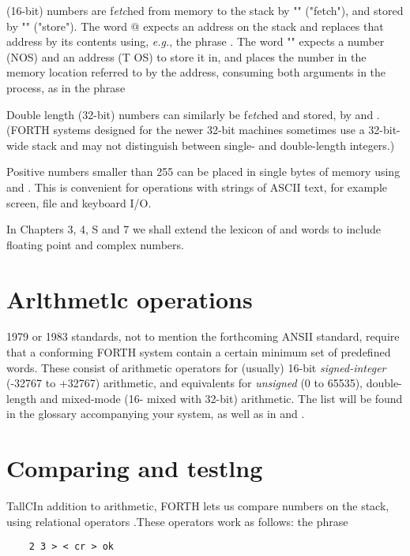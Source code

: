  (16-bit) numbers are f\textit{etc}hed from memory to the stack by "" ("fetch"), and stored by "\bc{!}" ("store"). The word @ expects an address on the stack and replaces that address by its contents using, \textit{e.g.}, the phrase . The word "\regc{!}" expects a number (NOS) and an address (T OS) to store it in, and places the number in the memory location referred to by the address, consuming both arguments in the process, as in the phrase 

Double length (32-bit) numbers can similarly be f\textit{etc}hed and stored, by  and  . (FORTH systems designed for the newer 32-bit machines sometimes use a 32-bit-wide stack and may not distinguish between single- and double-length integers.)

Positive numbers smaller than 255 can be placed in single bytes of memory using  and . This is convenient for operations with strings of ASCII text, for example screen, file and keyboard I/O.

In Chapters 3, 4, S and 7 we shall extend the lexicon of  and \regc{!} words to include floating point and complex numbers.

\section{Arlthmetlc operations}

 1979 or 1983 standards, not to mention the forthcoming ANSII standard, require that a conforming FORTH system contain a certain minimum set of predefined words. These consist of arithmetic operators  for (usually) 16-bit \textit{signed-integer} (-32767 to +32767) arithmetic, and equivalents for \textit{unsigned} (0 to 65535), double-length and mixed-mode (16- mixed with 32-bit) arithmetic. The list will be found in the glossary accompanying your system, as well as in \SF and \FTR.

\section{Comparing and testlng}

TallC{I}{n} addition to arithmetic, FORTH lets us compare numbers on the stack, using relational operators \bc{> < =}.These operators work as follows: the phrase

\begin{lstlisting}
    2 3 > < cr > ok
\end{lstlisting}

